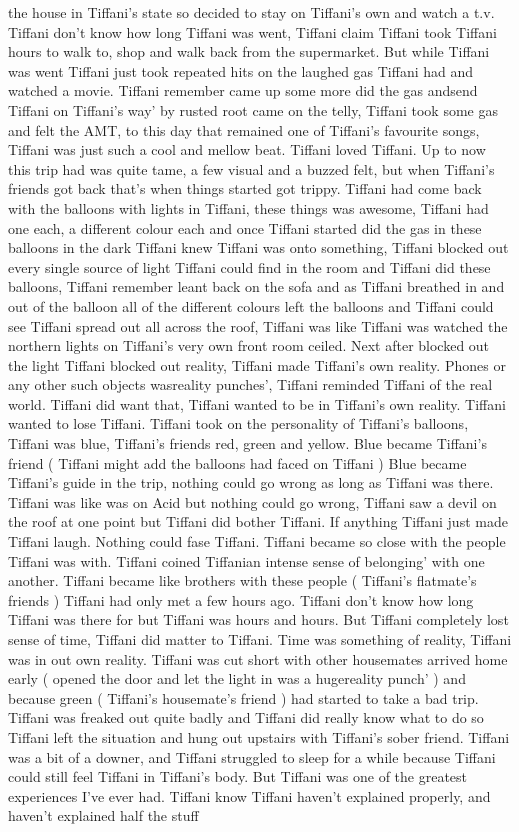 \documentclass[12pt]{book}
\begin{document}
the house in Tiffani's state so decided to stay on Tiffani's own and watch a t.v. Tiffani don't know how long Tiffani was went, Tiffani claim Tiffani took Tiffani hours to walk to, shop and walk back from the supermarket. But while Tiffani was went Tiffani just took repeated hits on the laughed gas Tiffani had and watched a movie. Tiffani remember came up some more did the gas andsend Tiffani on Tiffani's way' by rusted root came on the telly, Tiffani took some gas and felt the AMT, to this day that remained one of Tiffani's favourite songs, Tiffani was just such a cool and mellow beat. Tiffani loved Tiffani. Up to now this trip had was quite tame, a few visual and a buzzed felt, but when Tiffani's friends got back that's when things started got trippy. Tiffani had come back with the balloons with lights in Tiffani, these things was awesome, Tiffani had one each, a different colour each and once Tiffani started did the gas in these balloons in the dark Tiffani knew Tiffani was onto something, Tiffani blocked out every single source of light Tiffani could find in the room and Tiffani did these balloons, Tiffani remember leant back on the sofa and as Tiffani breathed in and out of the balloon all of the different colours left the balloons and Tiffani could see Tiffani spread out all across the roof, Tiffani was like Tiffani was watched the northern lights on Tiffani's very own front room ceiled. Next after blocked out the light Tiffani blocked out reality, Tiffani made Tiffani's own reality. Phones or any other such objects wasreality punches', Tiffani reminded Tiffani of the real world. Tiffani did want that, Tiffani wanted to be in Tiffani's own reality. Tiffani wanted to lose Tiffani. Tiffani took on the personality of Tiffani's balloons, Tiffani was blue, Tiffani's friends red, green and yellow. Blue became Tiffani's friend ( Tiffani might add the balloons had faced on Tiffani ) Blue became Tiffani's guide in the trip, nothing could go wrong as long as Tiffani was there. Tiffani was like was on Acid but nothing could go wrong, Tiffani saw a devil on the roof at one point but Tiffani did bother Tiffani. If anything Tiffani just made Tiffani laugh. Nothing could fase Tiffani. Tiffani became so close with the people Tiffani was with. Tiffani coined Tiffanian intense sense of belonging' with one another. Tiffani became like brothers with these people ( Tiffani's flatmate's friends ) Tiffani had only met a few hours ago. Tiffani don't know how long Tiffani was there for but Tiffani was hours and hours. But Tiffani completely lost sense of time, Tiffani did matter to Tiffani. Time was something of reality, Tiffani was in out own reality. Tiffani was cut short with other housemates arrived home early ( opened the door and let the light in was a hugereality punch' ) and because green ( Tiffani's housemate's friend ) had started to take a bad trip. Tiffani was freaked out quite badly and Tiffani did really know what to do so Tiffani left the situation and hung out upstairs with Tiffani's sober friend. Tiffani was a bit of a downer, and Tiffani struggled to sleep for a while because Tiffani could still feel Tiffani in Tiffani's body. But Tiffani was one of the greatest experiences I've ever had. Tiffani know Tiffani haven't explained properly, and haven't explained half the stuff 
\end{document}
